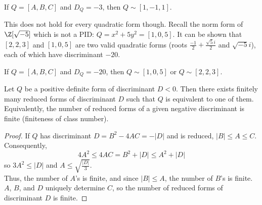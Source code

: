 \documentclass[11pt]{article}
\begin{document}
\begin{lemma}
If $Q = [A, B, C]$ and $D_{Q} = -3$, then $Q \sim [1, -1, 1]$.     
\end{lemma}

\begin{remark}
This does not hold for every quadratic form though. Recall the norm form of $\Z[\sqrt{-5}]$ which is not a PID: $Q = x^2 + 5y^2 = [1, 0, 5]$. It can be shown that $[2, 2, 3]$ and $[1, 0, 5]$ are two valid quadratic forms (roots $\frac{-1}{2} + \frac{\sqrt{5}i}{2}$ and $\sqrt{-5}i $), each of which have discriminant $-20$.
\end{remark}

\begin{lemma}
    If $Q = [A, B, C]$ and $D_{Q} = -20$, then $Q \sim [1, 0, 5]$ or $Q \sim [2, 2, 3]$.    
\end{lemma}

\begin{theorem}[Gauss]
Let $Q$ be a positive definite form of discriminant $D < 0$. Then there exists finitely many reduced forms of discriminant $D$ such that $Q$ is equivalent to one of them. \\

Equivalently, the number of reduced forms of a given negative discriminant is finite (finiteness of class number).
\end{theorem}

\begin{proof}
If $Q$ has discriminant $D = B^2 - 4AC = -|D|$ and is reduced, $|B| \leq A \leq C$. \\

Consequently, 
\[
    4A^2 \leq 4AC = B^2 + |D| \leq A^2 + |D|
\]
so $3A^2 \leq |D|$ and $A \leq \sqrt{\frac{|D|}{3}}$. \\

Thus, the number of $A$'s is finite, and since $|B| \leq A$, the number of $B$'s is finite. $A$, $B$, and $D$ uniquely determine $C$, so the number of reduced forms of discriminant $D$ is finite.
\end{proof}
\end{document}

